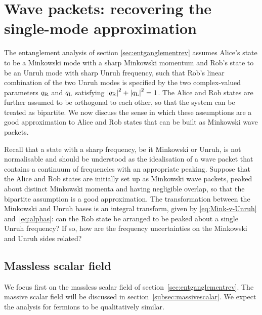 \section{Wave packets: recovering the single-mode approximation\label{sec:peaking}}

The entanglement analysis of section \ref{sec:entganglementrev}
assumes Alice's state
to be a Minkowski mode with a sharp Minkowski momentum and Rob's
state to be an Unruh mode with sharp Unruh frequency, 
such that Rob's linear combination of the two Unruh modes 
is specified by the two
complex-valued parameters $q_\text{\text{R}}$ and $q_\text{\text{L}}$ satisfying 
${|q_\text{\text{R}}|}^2 + {|q_\text{\text{L}}|}^2=1$. 
The Alice and Rob states are further
assumed to be orthogonal to each other, 
so that the system can be treated as
bipartite. We now discuss the sense in which these assumptions are a
good approximation to Alice and Rob states that can be built as
Minkowski wave packets.

Recall that a state with a sharp frequency, be it Minkowski or Unruh,
is not normalisable and should be understood as the idealisation of a
wave packet that contains a continuum of frequencies with an
appropriate peaking. Suppose that the Alice and Rob states are
initially set up as Minkowski wave packets, peaked about distinct
Minkowski momenta and having negligible overlap, so that the bipartite
assumption is a good approximation. The transformation between the
Minkowski and Unruh bases is an integral transform, given by 
\eqref{eq:Mink-v-Unruh}
and~\eqref{eq:alphas}: 
can the Rob state
be arranged to be peaked about a single Unruh frequency? If so, how
are the frequency uncertainties on the Minkowski and Unruh sides
related?

\subsection{Massless scalar field}\label{sec:peakingmassless}

We focus first on the massless scalar field of 
section~\ref{sec:entganglementrev}. 
The massive scalar field will be discussed 
in section~\ref{subsec:massivescalar}. 
We expect the analysis for fermions to be qualitatively
similar.

